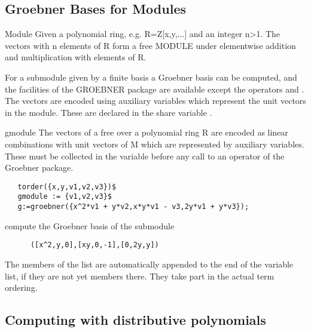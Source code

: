 \subsection{Groebner Bases for Modules}
\begin{Concept}{Module}
Given a polynomial ring, e.g. R=Z[x,y,...] and an integer n>1.
The vectors with n elements of R form a free MODULE under
elementwise addition and multiplication with elements of R.

For a submodule given by a finite basis a Groebner basis
can be computed, and the facilities of the GROEBNER package
are available except the operators 
and . The vectors are encoded using auxiliary
variables which represent the unit vectors in the module.
These are declared in the share variable .

\end{Concept}

\begin{Variable}{gmodule}
The vectors of a free  over a polynomial ring R 
are encoded as linear combinations with unit vectors of
M which are represented by auxiliary variables. These
must be collected in the variable  before
any call to an operator of the Groebner package.

\begin{verbatim}
   torder({x,y,v1,v2,v3})$
   gmodule := {v1,v2,v3}$
   g:=groebner({x^2*v1 + y*v2,x*y*v1 - v3,2y*v1 + y*v3});
\end{verbatim}

compute the Groebner basis of the submodule

\begin{verbatim}
      ([x^2,y,0],[xy,0,-1],[0,2y,y])
\end{verbatim}
The members of the list  are automatically
appended to the end of the variable list, if they are not
yet members there. They take part in the actual term ordering.
\end{Variable}

\subsection{Computing with distributive polynomials}

